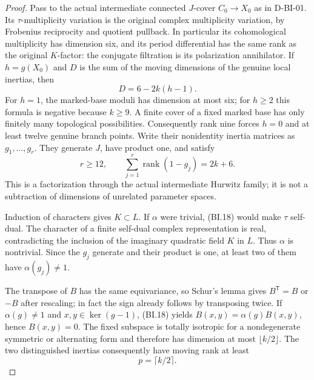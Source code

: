 \begin{proof}
Pass to the actual intermediate connected $J$-cover $C_0\to X_0$
as in D-BI-01.  Its $\tau$-multiplicity variation is the original
complex multiplicity variation, by Frobenius reciprocity and quotient
pullback.  In particular its cohomological multiplicity has dimension
six, and its period differential has the same rank as the original
$K$-factor: the conjugate filtration is its polarization annihilator.
If $h=g(X_0)$ and $D$ is the sum of the moving dimensions of the
genuine local inertias, then
\[
                         D=6-2k(h-1).
\]
For $h=1$, the marked-base moduli has dimension at most six; for
$h\ge2$ this formula is negative because $k\ge9$.  A finite cover
of a fixed marked base has only finitely many topological possibilities.
Consequently rank nine forces $h=0$ and at least twelve genuine
branch points.  Write their nonidentity inertia matrices as
$g_1,\ldots,g_r$.  They generate $J$, have product one, and satisfy
\[
 r\ge12,\qquad \sum_{j=1}^r\operatorname{rank}(1-g_j)=2k+6.
                                                               \tag{BI.20}
\]
This is a factorization through the actual intermediate Hurwitz family;
it is not a subtraction of dimensions of unrelated parameter spaces.

Induction of characters gives $K\subset L$.  If $\alpha$ were
trivial, (BI.18) would make $\tau$ self-dual.  The character of a
finite self-dual complex representation is real, contradicting the
inclusion of the imaginary quadratic field $K$ in $L$.  Thus $\alpha$
is nontrivial.  Since the $g_j$ generate and their product is one,
at least two of them have $\alpha(g_j)\ne1$.

The transpose of $B$ has the same equivariance, so Schur's lemma
gives $B^{\mathsf T}=B$ or $-B$ after rescaling; in fact the sign
already follows by transposing twice.  If $\alpha(g)\ne1$ and
$x,y\in\ker(g-1)$, (BI.18) yields
$B(x,y)=\alpha(g)B(x,y)$, hence $B(x,y)=0$.  The fixed subspace
is totally isotropic for a nondegenerate symmetric or alternating
form and therefore has dimension at most $\lfloor k/2\rfloor$.
The two distinguished inertias consequently have moving rank at least
\[
                            p=\lceil k/2\rceil.             \tag{BI.21}
\]


\end{proof}
